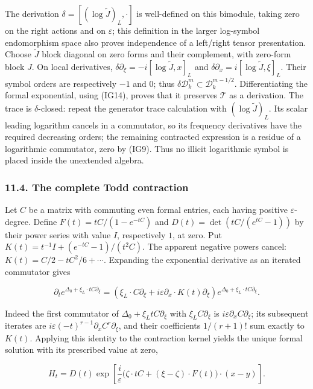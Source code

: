 \documentclass[
  11pt,
]{article}
\begin{document}
The derivation \(\delta=[(\log\widetilde J)_L,\cdot]\) is well-defined
on this bimodule, taking zero on the right actions and on
\(\varepsilon\); this definition in the larger log-symbol endomorphism
space also proves independence of a left/right tensor presentation.
Choose \(\widetilde J\) block diagonal on zero forms and their
complement, with zero-form block \(J\). On local derivatives,
\(\delta\partial_\xi=-i[\log\widetilde J,x]_L\) and
\(\delta\partial_x=i[\log\widetilde J,\xi]_L\). Their symbol orders are
respectively \(-1\) and \(0\); thus
\(\delta\mathcal D^m_k\subset\mathcal D^{m-1/2}_k\). Differentiating the
formal exponential, using (IG14), proves that it preserves
\(\mathcal T\) as a derivation. The trace is \(\delta\)-closed: repeat
the generator trace calculation with \((\log\widetilde J)_L\). Its
scalar leading logarithm cancels in a commutator, so its frequency
derivatives have the required decreasing orders; the remaining
contracted expression is a residue of a logarithmic commutator, zero by
(IG9). Thus no illicit logarithmic symbol is placed inside the
unextended algebra.

\subsubsection{11.4. The complete Todd
contraction}\label{the-complete-todd-contraction}

Let \(C\) be a matrix with commuting even formal entries, each having
positive \(\varepsilon\)-degree. Define \(F(t)=tC/(1-e^{-tC})\) and
\(D(t)=\det(tC/(e^{tC}-1))\) by their power series with value \(I\),
respectively \(1\), at zero. Put \(K(t)=t^{-1}I+(e^{-tC}-1)/(t^2C)\).
The apparent negative powers cancel: \(K(t)=C/2-tC^2/6+\cdots\).
Expanding the exponential derivative as an iterated commutator gives

\[
 \partial_t e^{\Delta_0+\xi_L\cdot tC\partial_\xi}
 =\left(\xi_L\cdot C\partial_\xi
       +i\varepsilon\partial_x\cdot K(t)\partial_\xi\right)
                   e^{\Delta_0+\xi_L\cdot tC\partial_\xi}.
\tag{IG17}
\]

Indeed the first commutator of \(\Delta_0+\xi_LtC\partial_\xi\) with
\(\xi_LC\partial_\xi\) is \(i\varepsilon\partial_x C\partial_\xi\); its
subsequent iterates are
\(i\varepsilon(-t)^{r-1}\partial_x C^r\partial_\xi\), and their
coefficients \(1/(r+1)!\) sum exactly to \(K(t)\). Applying this
identity to the contraction kernel yields the unique formal solution
with its prescribed value at zero,

\[
 H_t=D(t)\exp\!\left[\frac{i}{\varepsilon}
  \big(\zeta\cdot tC+(\xi-\zeta)\cdot F(t)\big)\cdot(x-y)\right].
\tag{IG18}
\]
\end{document}
